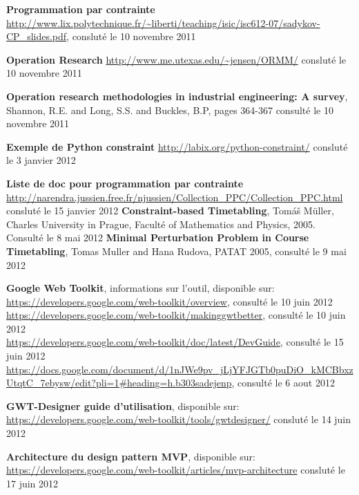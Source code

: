 \begin{thebibliography}{99}
\bibitem{}\textbf{Programmation par contrainte} \newline
\url{http://www.lix.polytechnique.fr/~liberti/teaching/isic/isc612-07/sadykov-CP_slides.pdf}, consluté le 10 novembre 2011

\bibitem{}\textbf{Operation Research} \newline
\url{http://www.me.utexas.edu/~jensen/ORMM/} consluté le 10 novembre 2011

\bibitem{} \textbf{Operation research methodologies in industrial engineering: A survey}, Shannon, R.E. and Long, S.S. and Buckles, B.P, pages 364-367 consulté le 10 novembre 2011

\bibitem{}\textbf{Exemple de Python constraint}  \newline
\url{http://labix.org/python-constraint/} consluté le 3 janvier 2012

\bibitem{}\textbf{Liste de doc pour programmation par contrainte} \newline
\url{http://narendra.jussien.free.fr/njussien/Collection_PPC/Collection_PPC.html} consluté le 15 janvier 2012
\bibitem{}\textbf{Constraint-based Timetabling}, Tomáš Müller, Charles University in Prague, Faculté of Mathematics and Physics, 2005. Consulté le 8 mai 2012
\bibitem{}\textbf{Minimal Perturbation Problem in Course Timetabling}, Tomas Muller and Hana Rudova, PATAT 2005, consulté le 9 mai 2012

\bibitem{} \textbf{Google Web Toolkit}, informations sur l'outil, disponible sur:\newline
\url{https://developers.google.com/web-toolkit/overview}, consulté le 10 juin 2012\\
\url{https://developers.google.com/web-toolkit/makinggwtbetter}, consulté le 10 juin 2012\\
\url{https://developers.google.com/web-toolkit/doc/latest/DevGuide}, consulté le 15 juin 2012 \\
\url{https://docs.google.com/document/d/1nJWe9pv_jLjYFJGTb0puDiO_kMCBbxzUtqtC_7ebysw/edit?pli=1\#heading=h.b303sadejenp}, consulté le 6 aout 2012


\bibitem{}\textbf{GWT-Designer guide d'utilisation}, disponible sur:\newline
\url{https://developers.google.com/web-toolkit/tools/gwtdesigner/}  consluté le 14 juin 2012

\bibitem{}\textbf{Architecture du design pattern MVP}, disponible sur: \newline
\url{https://developers.google.com/web-toolkit/articles/mvp-architecture} consluté le 17 juin 2012


\end{thebibliography}

